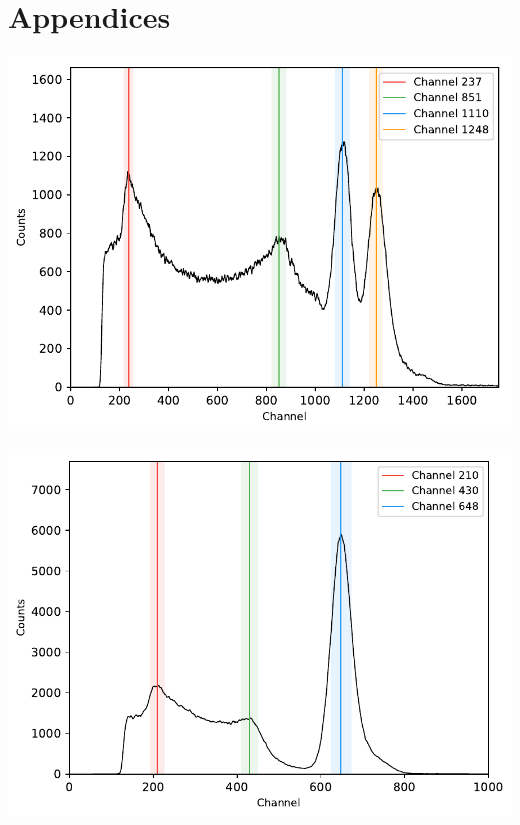 \newpage
%
\section*{Appendices}
%
\begin{multicols}{2}
%
\minipage{\linewidth}
    \begin{center}
        \captionsetup{type=figure}
        \begin{adjustbox}{max width=\linewidth, keepaspectratio}
            \includegraphics[]{pdf/60Co}
        \end{adjustbox}
        \captionsetup{width=0.75\linewidth}
        \label{fig:Spectrum60Co}
    \end{center}
\endminipage
%
\par
%
\minipage{\linewidth}
    \begin{center}
        \captionsetup{type=figure}
        \begin{adjustbox}{max width=\linewidth, keepaspectratio}
            \includegraphics[]{pdf/137Cs}

\end{adjustbox}
\end{center}
\end{multicols}
